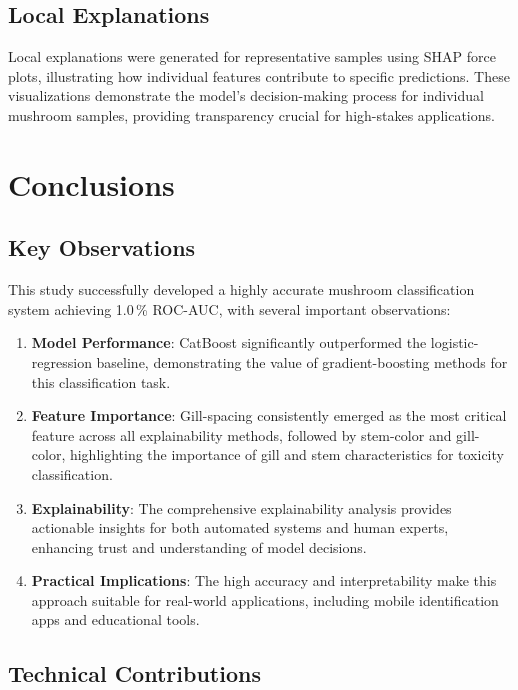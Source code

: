 \documentclass[11pt,a4paper]{article}
\begin{document}
\subsection{Local Explanations}

Local explanations were generated for representative samples using SHAP force plots, illustrating how individual features contribute to specific predictions. These visualizations demonstrate the model's decision-making process for individual mushroom samples, providing transparency crucial for high-stakes applications.

\section{Conclusions}
\label{sec:conclusion}

\subsection{Key Observations}

This study successfully developed a highly accurate mushroom classification system achieving 1.0\,\% ROC-AUC, with several important observations:

\begin{enumerate}
    \item \textbf{Model Performance}: CatBoost significantly outperformed the logistic-regression baseline, demonstrating the value of gradient-boosting methods for this classification task.
    \item \textbf{Feature Importance}: Gill-spacing consistently emerged as the most critical feature across all explainability methods, followed by stem-color and gill-color, highlighting the importance of gill and stem characteristics for toxicity classification.
    \item \textbf{Explainability}: The comprehensive explainability analysis provides actionable insights for both automated systems and human experts, enhancing trust and understanding of model decisions.
    \item \textbf{Practical Implications}: The high accuracy and interpretability make this approach suitable for real-world applications, including mobile identification apps and educational tools.
\end{enumerate}

\subsection{Technical Contributions}
\end{document}
